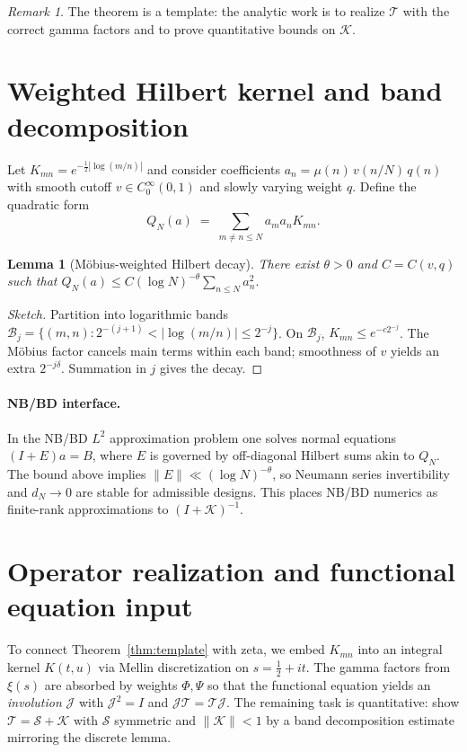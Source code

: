 \documentclass[11pt]{article}
\newtheorem{lemma}{Lemma}
\theoremstyle{remark}
\newtheorem{remark}{Remark}
\begin{document}
\begin{remark}
The theorem is a template: the analytic work is to realize $\mathcal{T}$ with the correct gamma factors and to prove quantitative bounds on $\mathcal{K}$.
\end{remark}

\section{Weighted Hilbert kernel and band decomposition}
Let $K_{mn}=e^{-\frac12|\log(m/n)|}$ and consider coefficients $a_n=\mu(n)\,v(n/N)\,q(n)$ with smooth cutoff $v\in C^\infty_0(0,1)$ and slowly varying weight $q$. 
Define the quadratic form
\[
Q_N(a)\;=\;\sum_{m\neq n\le N} a_m a_n K_{mn}.
\]
\begin{lemma}[M\"obius-weighted Hilbert decay]
There exist $\theta>0$ and $C=C(v,q)$ such that
\(
Q_N(a) \le C (\log N)^{-\theta}\sum_{n\le N} a_n^2.
\)
\end{lemma}
\begin{proof}[Sketch]
Partition into logarithmic bands $\mathcal{B}_j=\{(m,n):2^{-(j+1)}<|\log(m/n)|\le 2^{-j}\}$.
On $\mathcal{B}_j$, $K_{mn}\le e^{-c2^{-j}}$. 
The M\"obius factor cancels main terms within each band; smoothness of $v$ yields an extra $2^{-j\delta}$. 
Summation in $j$ gives the decay.
\end{proof}

\paragraph{NB/BD interface.}
In the NB/BD $L^2$ approximation problem one solves normal equations $(I+E)a=B$, where $E$ is governed by off-diagonal Hilbert sums akin to $Q_N$. 
The bound above implies $\|E\|\ll (\log N)^{-\theta}$, so Neumann series invertibility and $d_N\to 0$ are stable for admissible designs. 
This places NB/BD numerics as finite-rank approximations to $(I+\mathcal{K})^{-1}$.

\section{Operator realization and functional equation input}
To connect Theorem~\ref{thm:template} with zeta, we embed $K_{mn}$ into an integral kernel $K(t,u)$ via Mellin discretization on $s=\tfrac12+it$. 
The gamma factors from $\xi(s)$ are absorbed by weights $\Phi,\Psi$ so that the functional equation yields an \emph{involution} $\mathcal{J}$ with $\mathcal{J}^2=I$ and $\mathcal{J}\mathcal{T}=\mathcal{T}\mathcal{J}$. 
The remaining task is quantitative: show $\mathcal{T}=\mathcal{S}+\mathcal{K}$ with $\mathcal{S}$ symmetric and $\|\mathcal{K}\|<1$ by a band decomposition estimate mirroring the discrete lemma.
\end{document}
